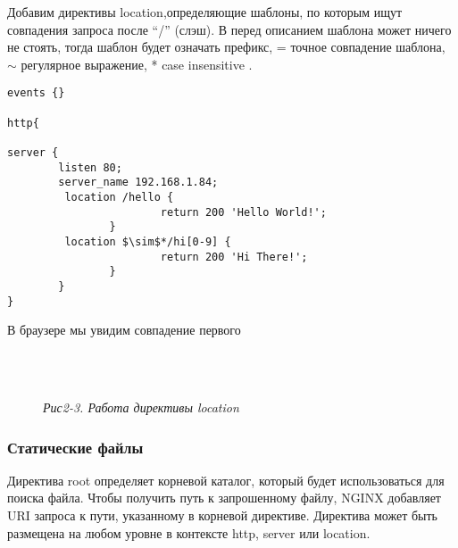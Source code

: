\documentclass[14pt, a4paper]{article}
\begin{document}
Добавим директивы \colorbox{backcolour}{location},определяющие шаблоны, по которым ищут совпадения запроса после
“/” (слэш). В перед описанием шаблона может ничего не стоять, тогда шаблон будет означать
префикс, = точное совпадение шаблона, $\sim$ регулярное выражение, * case insensitive .

\vspace{0.3cm}
\begin{lstlisting}
events {}

http{

server {
        listen 80;
        server_name 192.168.1.84;
         location /hello {
                        return 200 'Hello World!';
                }
         location $\sim$*/hi[0-9] {
                        return 200 'Hi There!';
                }
        }
}
\end{lstlisting}
\vspace{0.2cm}

В браузере мы увидим совпадение первого


\begin{figure}[h]
    \centering
    \\ 
    \label{framework} 
\end{figure}

\newpage

\begin{figure}[h]
    \centering
    \\ 
    \small\textit{Рис2-3. Работа директивы location}   
    \label{framework} 
\end{figure}

\subsubsection*{Статические файлы} 

Директива \colorbox{backcolour}{root} определяет корневой каталог, который будет использоваться для поиска файла.
Чтобы получить путь к запрошенному файлу, NGINX добавляет URI запроса к пути, указанному в
корневой директиве. Директива может быть размещена на любом уровне в контексте \colorbox{backcolour}{http}, \colorbox{backcolour}{server}
или \colorbox{backcolour}{location}.
\end{document}
